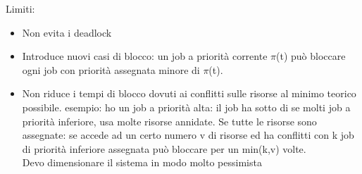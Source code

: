 \documentclass[12pt, oneside]{extbook}
\begin{document}
Limiti:
\begin{itemize}
\item Non evita i deadlock
\item Introduce nuovi casi di blocco: un job a priorità corrente $\pi$(t) può bloccare ogni job con priorità assegnata minore di $\pi$(t).
\item Non riduce i tempi di blocco dovuti ai conflitti sulle risorse al minimo teorico possibile. esempio: ho un job a priorità alta: il job ha sotto di se molti job a priorità inferiore, usa molte risorse annidate. Se tutte le risorse sono assegnate: se accede ad un certo numero v di risorse ed ha conflitti con k job di priorità inferiore assegnata può bloccare per un min(k,v) volte.\\ Devo dimensionare il sistema in modo molto pessimista
\end{itemize}
\end{document}
